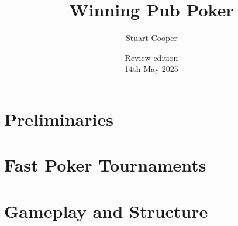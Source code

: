 \documentclass{book}
\begin{document}



\title{Winning Pub Poker}
\author{Stuart Cooper}
\date{Review edition\\14th May 2025}


\maketitle
\tableofcontents

\part{Preliminaries}










\part{Fast Poker Tournaments}







\part{Gameplay and Structure}



\end{document}
